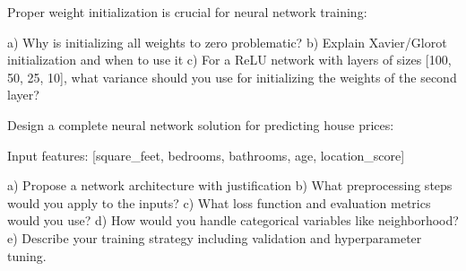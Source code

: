 \documentclass{article}
\begin{document}
\begin{problembox}[title= Initialization Strategies]

Proper weight initialization is crucial for neural network training:

a) Why is initializing all weights to zero problematic?
b) Explain Xavier/Glorot initialization and when to use it
c) For a ReLU network with layers of sizes [100, 50, 25, 10], what variance should you use for initializing the weights of the second layer?
\end{problembox}

\begin{problembox}[title= Real-world Application]

Design a complete neural network solution for predicting house prices:

Input features: [square_feet, bedrooms, bathrooms, age, location_score]

a) Propose a network architecture with justification
b) What preprocessing steps would you apply to the inputs?
c) What loss function and evaluation metrics would you use?
d) How would you handle categorical variables like neighborhood?
e) Describe your training strategy including validation and hyperparameter tuning.
\end{problembox}
\end{document}
